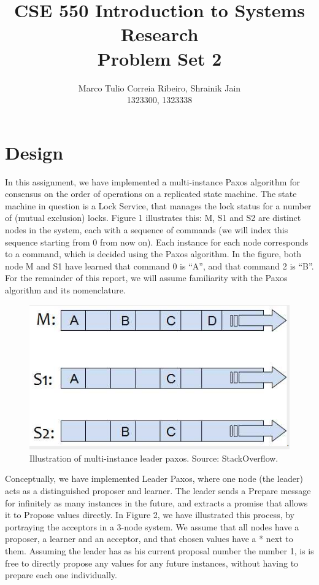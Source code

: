 \documentclass[letterpaper]{article}
\title{CSE 550 Introduction to Systems Research \\ Problem Set 2}
\begin{document}
\author{Marco Tulio Correia Ribeiro, Shrainik Jain\\ 1323300, 1323338}
\maketitle

\section{Design}
In this assignment, we have implemented a multi-instance Paxos algorithm for
consensus on the order of operations on a replicated state machine. The state
machine in question is a Lock Service, that manages the lock status for a number
of (mutual exclusion) locks. Figure 1 illustrates this: M, S1 and S2 are
distinct nodes in the system, each with a sequence of commands (we will index
this sequence starting from 0 from now on). Each instance for each node
corresponds to a command, which is decided using the Paxos algorithm. In the
figure, both node M and S1 have learned that command 0 is ``A'', and that
command 2 is ``B''. For the remainder of this report, we will assume familiarity
with the Paxos algorithm and its nomenclature.

\begin{figure}[h!]
\centering
\includegraphics[scale=.5]{multipaxos.png}
\caption{Illustration of multi-instance leader paxos. Source: StackOverflow.}
\end{figure}

\pagebreak
Conceptually, we have implemented Leader Paxos, where one node (the leader) acts as a
distinguished proposer and learner. The leader sends a Prepare message for
infinitely as many instances in the future, and extracts a promise that allows
it to Propose values directly. In Figure 2, we have illustrated this process, by
portraying the acceptors in a 3-node system. We assume that all nodes have a
proposer, a learner and an acceptor, and that chosen values have a * next to
them. Assuming the leader has as his current proposal number the number 1, is is
free to directly propose any values for any future instances, without having to
prepare each one individually. 
\end{document}
